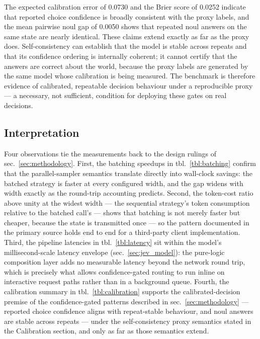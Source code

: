 \documentclass[
  english,
]{article}
\begin{document}
The expected calibration error of 0.0730 and the Brier score of 0.0252
indicate that reported choice confidence is broadly consistent with the
proxy labels, and the mean pairwise noul gap of 0.0050 shows that
repeated noul answers on the same state are nearly identical. These
claims extend exactly as far as the proxy does. Self-consistency can
establish that the model is stable across repeats and that its
confidence ordering is internally coherent; it cannot certify that the
answers are correct about the world, because the proxy labels are
generated by the same model whose calibration is being measured. The
benchmark is therefore evidence of calibrated, repeatable decision
behaviour under a reproducible proxy --- a necessary, not sufficient,
condition for deploying these gates on real decisions.

\subsection{Interpretation}\label{interpretation}

Four observations tie the measurements back to the design rulings of
sec.~\ref{sec:methodology}. First, the batching speedups in
tbl.~\ref{tbl:batching} confirm that the parallel-sampler semantics
translate directly into wall-clock savings: the batched strategy is
faster at every configured width, and the gap widens with width exactly
as the round-trip accounting predicts. Second, the token-cost ratio
above unity at the widest width --- the sequential strategy's token
consumption relative to the batched call's --- shows that batching is
not merely faster but cheaper, because the state is transmitted once ---
so the pattern documented in the primary source
\citep{typesafe2026patterns} holds end to end for a third-party client
implementation. Third, the pipeline latencies in tbl.~\ref{tbl:latency}
sit within the model's millisecond-scale latency envelope
(sec.~\ref{sec:jev_model}): the pure-logic composition layer adds no
measurable latency beyond the network round trip, which is precisely
what allows confidence-gated routing to run inline on interactive
request paths rather than in a background queue. Fourth, the calibration
summary in tbl.~\ref{tbl:calibration} supports the calibrated-decision
premise of the confidence-gated patterns described in
sec.~\ref{sec:methodology} --- reported choice confidence aligns with
repeat-stable behaviour, and noul answers are stable across repeats ---
under the self-consistency proxy semantics stated in the Calibration
section, and only as far as those semantics extend.
\end{document}
